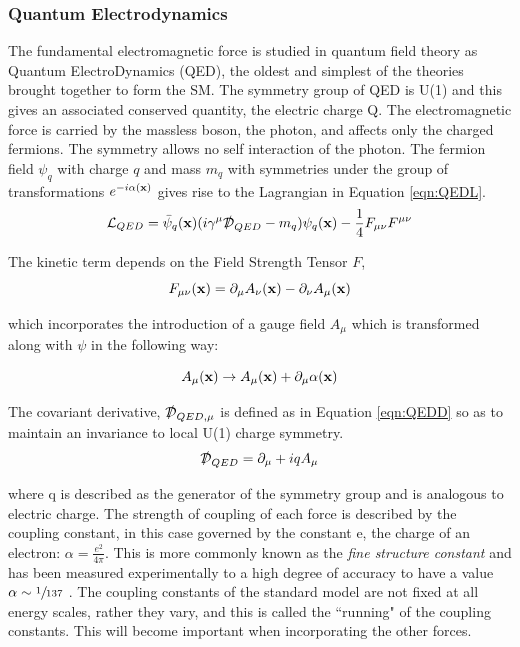 \subsubsection{Quantum Electrodynamics}

The fundamental electromagnetic force is studied in quantum field theory as Quantum ElectroDynamics (QED), the oldest and simplest of the theories brought together to form the SM. The symmetry group of QED is U(1) and this gives an associated conserved quantity, the electric charge Q. The electromagnetic force is carried by the massless boson, the photon, and affects only the charged fermions. The symmetry allows no self interaction of the photon. The fermion field $\psi_{q}$ with charge $q$ and mass $m_{q}$ with symmetries under the group of transformations $e^{-i\alpha(\mathbf{x})}$ gives rise to the Lagrangian in Equation \ref{eqn:QEDL}.
\begin{equation}
{\mathcal{L}}_{QED} = \bar{\psi}_{q}(\mathbf{x})(i \gamma^{\mu}\slashed{\mathcal{D}}_{QED} - m_{q}) \psi_{q}(\mathbf{x}) - \frac{1}{4}F_{\mu \nu}F^{\mu \nu}
\label{eqn:QEDL}
\end{equation}

The kinetic term depends on the Field Strength Tensor $F$, 
\begin{equation}
F_{\mu \nu} (\mathbf{x}) = \partial_{\mu} A_{\nu}(\mathbf{x}) -   \partial_{\nu} A_{\mu}(\mathbf{x}) 
\end{equation}

which incorporates the introduction of a gauge field $A_{\mu}$ which is transformed along with $\psi$ in the following way:

\begin{equation}
A_{\mu}(\mathbf{x}) \rightarrow A_{\mu}(\mathbf{x}) + \partial_{\mu} \alpha(\mathbf{x})
\label{AQED}
\end{equation}

The  covariant derivative, $\slashed{\mathcal{D}}_{QED,\mu}$ is defined as in Equation \ref{eqn:QEDD} so as to maintain an invariance to local U(1) charge symmetry. 
\begin{equation}
\slashed{\mathcal{D}}_{QED} = \partial_{\mu} + iqA_{\mu}
\label{eqn:QEDD}
\end{equation}


where q is described as the generator of the symmetry group and is analogous to electric charge. The strength of coupling of each force is described by the coupling constant, in this case governed by the constant e, the charge of an electron: $\alpha = \frac{e^{2}}{4\pi}$. This is more commonly known as the \textit{fine structure constant} and has been measured experimentally to a high degree of accuracy to have a value $\alpha \sim \sfrac{1}{137}$ \cite{qedalpha}. The coupling constants of the standard model are not fixed at all energy scales, rather they vary, and this is called the ``running" of the coupling constants. This will become important when incorporating the other forces. 

